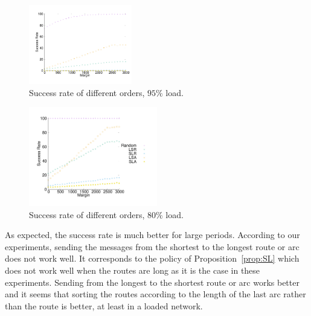 \documentclass[10pt, conference, letterpaper]{IEEEtran}
\begin{document}
\begin{figure}[H] 
  
  \centering
     \hspace{-1.5cm} \includegraphics[width=0.4\textwidth]{departs_gp_21000.pdf}
\vspace{-0.75cm}
      \caption{Success rate of different orders, $95\%$ load.}
          \end{figure}
          \vspace{-1cm}
\begin{figure}[H] 
          \includegraphics[width=0.5\textwidth]{departs_gp_25000.pdf}
          \vspace{-1cm}
      \caption{Success rate of different orders, $80\%$ load.}
           \label{fig:success30000}
     \end{figure}
     
     As expected, the  success rate is much better for large periods. According to our experiments, sending the messages from the shortest to the longest route or arc does not work well. It corresponds to the policy of Proposition~\ref{prop:SL} which does not work well when the routes are long as it is the case in these experiments. Sending from the longest to the shortest route or arc works better and it seems that sorting the routes according to the length of the last arc rather than the route is better, at least in a loaded network. 
     
\end{document}
